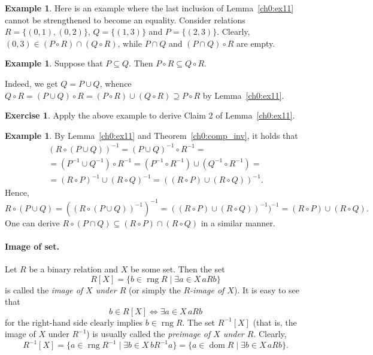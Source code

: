 \documentclass[12pt,notitlepage]{article}
\theoremstyle{plain}
\theoremstyle{definition}
\newtheorem{exc}[thm]{Exercise}
\newtheorem{exm}[thm]{Example}
\theoremstyle{plain}
\newcommand{\sbs}{\subseteq}
\newcommand{\dom}{\mathop{\mathrm{dom}}}
\newcommand{\rng}{\mathop{\mathrm{rng}}}
\newcommand{\1}{\mathbf{1}}
\newcommand{\0}{\mathbf{0}}
\begin{document}
\begin{exm}
Here is an example where the last inclusion of Lemma~\ref{ch0:ex11} cannot be strengthened to become an equality. Consider relations $R = \{(0,1), (0,2)\}$, $Q = \{(1,3)\}$ and $P = \{(2,3)\}$. Clearly, $(0,3) \in (P \circ R) \cap (Q \circ R)$, while $P \cap Q$ and $(P\cap Q) \circ R$ are empty.
\end{exm}

\begin{exm}
Suppose that $P \sbs Q$. Then $P \circ R \sbs Q \circ R$.

Indeed, we get $Q = P \cup Q$, whence
$Q \circ R = (P \cup Q) \circ R = (P \circ R) \cup (Q \circ R) \supseteq P \circ R$ by Lemma~\ref{ch0:ex11}.
\end{exm}

\begin{exc}
Apply the above example to derive Claim 2 of Lemma~\ref{ch0:ex11}.
\end{exc}


\begin{exm}\label{ch0:exm17}
By Lemma~\ref{ch0:ex11} and Theorem~\ref{ch0:comp_inv}, it holds that
\begin{multline*}
(R \circ (P \cup Q))^{-1} = (P \cup Q)^{-1} \circ R^{-1} =\\
=(P^{-1} \cup Q^{-1}) \circ R^{-1} = (P^{-1} \circ R^{-1}) \cup (Q^{-1} \circ R^{-1}) =\\
=(R \circ P)^{-1} \cup (R \circ Q)^{-1} = ((R \circ P) \cup (R \circ Q))^{-1}.
\end{multline*}
Hence,
$$
R \circ (P \cup Q) = ((R \circ (P \cup Q))^{-1})^{-1} = ((R \circ P) \cup (R \circ Q))^{-1})^{-1} = (R \circ P) \cup (R \circ Q).
$$
One can derive $R \circ (P \cap Q) \sbs (R \circ P) \cap (R \circ Q)$ in a similar manner.
\end{exm}

\paragraph{Image of set.} Let $R$ be a binary relation and $X$ be some set. Then the set
$$R[X] = \{ b \in \rng R \mid \exists a \in X\, a R b \}$$
is called the \emph{image of $X$ under $R$} (or simply the \emph{$R$-image of $X$}). It is easy to see that
$$b \in R[X] \iff \exists a \in X\, a R b$$
for the right-hand side clearly implies $b \in \rng R$. The set $R^{-1}[X]$ (that is, the image of $X$ under $R^{-1}$) is usually called the \emph{preimage of $X$ under $R$}. Clearly,
$$R ^{-1}[X] = \{ a \in \rng R^{-1} \mid \exists b \in X\, b R^{-1} a \} =  \{ a \in \dom R \mid \exists b \in X\, a R b \}.$$
\end{document}
